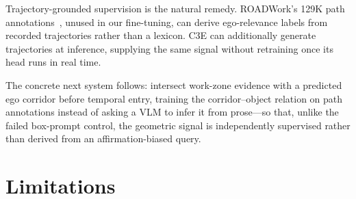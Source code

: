 \documentclass[10pt,twocolumn,letterpaper]{article}
\begin{document}
Trajectory-grounded supervision is the natural remedy.  ROADWork's 129K path annotations~\cite{ghosh2025roadwork}, unused in our fine-tuning, can derive ego-relevance labels from recorded trajectories rather than a lexicon.  C3E can additionally generate trajectories at inference, supplying the same signal without retraining once its head runs in real time.

The concrete next system follows: intersect work-zone evidence with a predicted ego corridor before temporal entry, training the corridor--object relation on path annotations instead of asking a VLM to infer it from prose---so that, unlike the failed box-prompt control, the geometric signal is independently supervised rather than derived from an affirmation-biased query.

\section{Limitations}
\label{sec:limitations}
\end{document}
